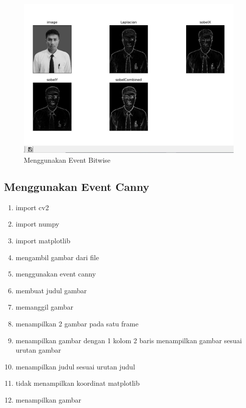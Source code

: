 \begin{figure}[ht]
\centering
\includegraphics[scale=0.45]{figures/2,68.jpg}
\caption{Menggunakan Event Bitwise}
\label{contoh}
\end{figure}




\newpage
\subsection{Menggunakan Event Canny}

\begin{enumerate}
	\item import cv2
	\item import numpy
	\item import matplotlib
	\item mengambil gambar dari file
	\item menggunakan event canny
	\item membuat judul gambar
	\item memanggil gambar
	\item menampilkan 2 gambar pada satu frame
	\item menampilkan gambar dengan 1 kolom 2 baris menampilkan gambar sesuai urutan gambar
	\item menampilkan judul sesuai urutan judul
	\item tidak menampilkan koordinat matplotlib
	\item menampilkan gambar
\end{enumerate}

